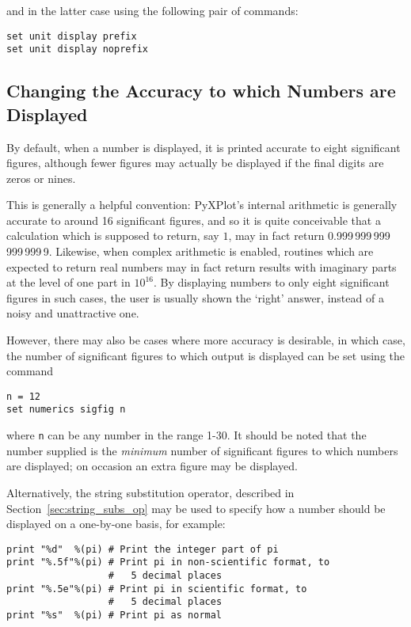 \noindent and in the latter case using the following pair of commands:

\begin{verbatim}
set unit display prefix
set unit display noprefix
\end{verbatim}

\subsection{Changing the Accuracy to which Numbers are Displayed}

By default, when a number is displayed, it is printed accurate to eight
significant figures, although fewer figures may actually be displayed if the
final digits are zeros or nines.

This is generally a helpful convention: PyXPlot's internal arithmetic is
generally accurate to around 16 significant figures, and so it is quite
conceivable that a calculation which is supposed to return, say $1$, may in
fact return 0.999\,999\,999\,999\,999\,9. Likewise, when complex arithmetic is
enabled, routines which are expected to return real numbers may in fact return
results with imaginary parts at the level of one part in $10^{16}$.  By
displaying numbers to only eight significant figures in such cases, the user is
usually shown the `right' answer, instead of a noisy and unattractive one.

However, there may also be cases where more accuracy is desirable, in which
case, the number of significant figures to which output is displayed can be set
using the command

\begin{verbatim}
n = 12
set numerics sigfig n
\end{verbatim}

\noindent where {\tt n} can be any number in the range 1-30. It should be noted
that the number supplied is the {\it minimum} number of significant figures to
which numbers are displayed; on occasion an extra figure may be displayed.

Alternatively, the string substitution operator, described in
Section~\ref{sec:string_subs_op} may be used to specify how a number should be
displayed on a one-by-one basis, for example:

\begin{verbatim}
print "%d"  %(pi) # Print the integer part of pi
print "%.5f"%(pi) # Print pi in non-scientific format, to
                  #   5 decimal places
print "%.5e"%(pi) # Print pi in scientific format, to
                  #   5 decimal places
print "%s"  %(pi) # Print pi as normal
\end{verbatim}

